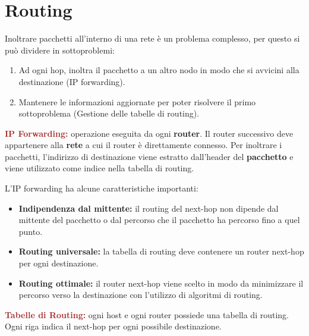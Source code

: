 \section{Routing}
Inoltrare pacchetti all'interno di una rete è un problema complesso, per questo si può dividere in sottoproblemi:
\begin{enumerate}
    \item Ad ogni hop, inoltra il pacchetto a un altro nodo in modo che si avvicini alla destinazione (IP forwarding).
    \item Mantenere le informazioni aggiornate per poter risolvere il primo sottoproblema (Gestione delle tabelle di routing).
\end{enumerate}

\begin{boxDef}
\textbf{\textcolor{brown}{IP Forwarding:}} operazione eseguita da ogni \textbf{router}. Il router successivo deve appartenere alla \textbf{rete} a cui il router è direttamente connesso. Per inoltrare i pacchetti, l'indirizzo di destinazione viene estratto dall'header del \textbf{pacchetto} e viene utilizzato come indice nella tabella di routing.
\end{boxDef}
L'IP forwarding ha alcune caratteristiche importanti:
\begin{itemize}
    \item \textbf{Indipendenza dal mittente:} il routing del next-hop non dipende dal mittente del pacchetto o dal percorso che il pacchetto ha percorso fino a quel punto.
    \item \textbf{Routing universale:} la tabella di routing deve contenere un router next-hop per ogni destinazione.
    \item \textbf{Routing ottimale:} il router next-hop viene scelto in modo da minimizzare il percorso verso la destinazione con l'utilizzo di algoritmi di routing.
\end{itemize}

\begin{boxDef}
\textbf{\textcolor{brown}{Tabelle di Routing:}} ogni host e ogni router possiede una tabella di routing. Ogni riga indica il next-hop per ogni possibile destinazione.
\end{boxDef}

